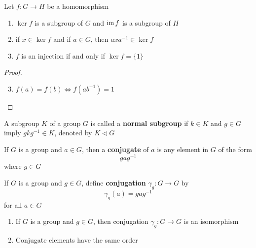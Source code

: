 \documentclass[11pt]{article}
\begin{document}
\begin{proposition}[]
Let \(f:G\to H\) be a homomorphism
\begin{enumerate}
\item \(\ker f\) is a subgroup of \(G\) and \(\operatorname{im} f\) is a subgroup of \(H\)
\item if \(x\in\ker f\) and if \(a\in G\), then \(axa^{-1}\in\ker f\)
\item \(f\) is an injection if and only if \(\ker f=\{1\}\)
\end{enumerate}
\end{proposition}

\begin{proof}
\begin{enumerate}
\setcounter{enumi}{2}
\item \(f(a)=f(b)\Leftrightarrow f(ab^{-1})=1\)
\end{enumerate}
\end{proof}

\begin{definition}[]
A subgroup \(K\) of a group \(G\) is called a \textbf{normal subgroup} if \(k\in K\)
and \(g\in G\) imply \(gkg^{-1}\in K\), denoted by \(K\triangleleft G\)
\end{definition}

\begin{definition}[]
If \(G\) is a group and \(a\in G\), then a \textbf{conjugate} of \(a\) is any element
in \(G\) of the form
\begin{equation*}
gag^{-1}
\end{equation*}
where \(g\in G\)
\end{definition}

\begin{definition}[]
If \(G\) is a group and \(g\in G\), define \textbf{conjugation} \(\gamma_g:G\to G\) by
\begin{equation*}
\gamma_g(a)=gag^{-1}
\end{equation*}
for all \(a\in G\)
\end{definition}

\begin{proposition}[]
\begin{enumerate}
\item If \(G\) is a group and \(g\in G\), then conjugation \(\gamma_g:G\to G\) is an
isomorphism
\item Conjugate elements have the same order
\end{enumerate}
\end{proposition}
\end{document}
